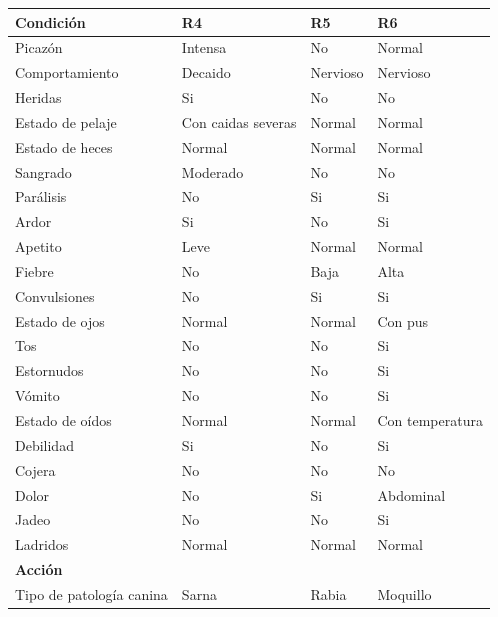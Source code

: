 \documentclass[a4paper,table,xcdraw]{article}
\begin{document}
\begin{table}[H]
\centering
\begin{tabular}{|l|l|l|l|}
\hline
\textbf{Condición}       & R4 & R5 & R6 \\ \hline
Picazón & Intensa  & No   & Normal   \\ \hline
Comportamiento & Decaido & Nervioso   & Nervioso   \\ \hline
Heridas & Si & No   & No   \\ \hline
Estado de pelaje & Con caidas severas  & Normal   & Normal   \\ \hline
Estado de heces & Normal & Normal   & Normal   \\ \hline
Sangrado & Moderado & No   & No   \\ \hline
Parálisis & No & Si    & Si   \\ \hline
Ardor & Si & No   & Si   \\ \hline
Apetito & Leve & Normal    & Normal   \\ \hline
Fiebre & No & Baja   & Alta   \\ \hline
Convulsiones & No & Si   & Si   \\ \hline
Estado de ojos & Normal & Normal   & Con pus    \\ \hline
Tos & No & No   & Si   \\ \hline
Estornudos & No & No   & Si    \\ \hline
Vómito & No & No   & Si    \\ \hline
Estado de oídos & Normal & Normal   & Con temperatura   \\ \hline
Debilidad & Si & No   & Si   \\ \hline
Cojera & No & No   & No    \\ \hline
Dolor & No & Si    & Abdominal   \\ \hline
Jadeo & No & No & Si   \\ \hline
Ladridos & Normal & Normal   & Normal   \\ \hline
\textbf{Acción}          &    &    &    \\ \hline
Tipo de patología canina & Sarna & Rabia & Moquillo \\ \hline
\end{tabular}
\end{table}
\end{document}
